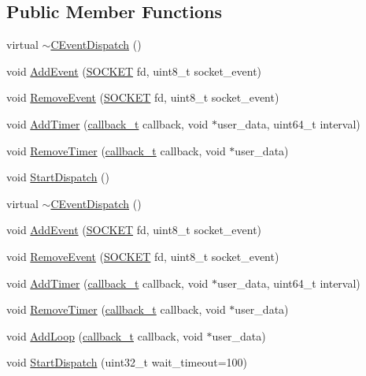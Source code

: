 \subsection*{Public Member Functions}
\begin{DoxyCompactItemize}
\item 
virtual \hyperlink{class_c_event_dispatch_ab393952e9e649f29b95c709646d99e7c}{$\sim$\+C\+Event\+Dispatch} ()
\item 
void \hyperlink{class_c_event_dispatch_a95cbad2b9e61df610c5dd9534996c272}{Add\+Event} (\hyperlink{base_2ostype_8h_a8dc8083897335125630f1af5dafd5831}{S\+O\+C\+K\+E\+T} fd, uint8\+\_\+t socket\+\_\+event)
\item 
void \hyperlink{class_c_event_dispatch_aa6d464f2c209691374ef3ac9599d6ac9}{Remove\+Event} (\hyperlink{base_2ostype_8h_a8dc8083897335125630f1af5dafd5831}{S\+O\+C\+K\+E\+T} fd, uint8\+\_\+t socket\+\_\+event)
\item 
void \hyperlink{class_c_event_dispatch_a6db322cd21109074adc92a85aa5654e9}{Add\+Timer} (\hyperlink{msfs_2include_2common_2ostype_8h_a126e68a4e9bb7ecb6c88b2eeb66a0ee7}{callback\+\_\+t} callback, void $\ast$user\+\_\+data, uint64\+\_\+t interval)
\item 
void \hyperlink{class_c_event_dispatch_ac5c65d49b2ef0f44f0381a0c187b490a}{Remove\+Timer} (\hyperlink{msfs_2include_2common_2ostype_8h_a126e68a4e9bb7ecb6c88b2eeb66a0ee7}{callback\+\_\+t} callback, void $\ast$user\+\_\+data)
\item 
void \hyperlink{class_c_event_dispatch_a6b17aa73ff4b3772dd9a9a7a9e24a4a0}{Start\+Dispatch} ()
\item 
virtual \hyperlink{class_c_event_dispatch_af9d7c2c1a056271c26a81a535b19b8e8}{$\sim$\+C\+Event\+Dispatch} ()
\item 
void \hyperlink{class_c_event_dispatch_a95cbad2b9e61df610c5dd9534996c272}{Add\+Event} (\hyperlink{base_2ostype_8h_a8dc8083897335125630f1af5dafd5831}{S\+O\+C\+K\+E\+T} fd, uint8\+\_\+t socket\+\_\+event)
\item 
void \hyperlink{class_c_event_dispatch_aa6d464f2c209691374ef3ac9599d6ac9}{Remove\+Event} (\hyperlink{base_2ostype_8h_a8dc8083897335125630f1af5dafd5831}{S\+O\+C\+K\+E\+T} fd, uint8\+\_\+t socket\+\_\+event)
\item 
void \hyperlink{class_c_event_dispatch_a6db322cd21109074adc92a85aa5654e9}{Add\+Timer} (\hyperlink{msfs_2include_2common_2ostype_8h_a126e68a4e9bb7ecb6c88b2eeb66a0ee7}{callback\+\_\+t} callback, void $\ast$user\+\_\+data, uint64\+\_\+t interval)
\item 
void \hyperlink{class_c_event_dispatch_ac5c65d49b2ef0f44f0381a0c187b490a}{Remove\+Timer} (\hyperlink{msfs_2include_2common_2ostype_8h_a126e68a4e9bb7ecb6c88b2eeb66a0ee7}{callback\+\_\+t} callback, void $\ast$user\+\_\+data)
\item 
void \hyperlink{class_c_event_dispatch_aed347074ca39224d085694bfa3ea12ad}{Add\+Loop} (\hyperlink{msfs_2include_2common_2ostype_8h_a126e68a4e9bb7ecb6c88b2eeb66a0ee7}{callback\+\_\+t} callback, void $\ast$user\+\_\+data)
\item 
void \hyperlink{class_c_event_dispatch_a2061e62d0c803085accbda160d9d8418}{Start\+Dispatch} (uint32\+\_\+t wait\+\_\+timeout=100)
\end{DoxyCompactItemize}
